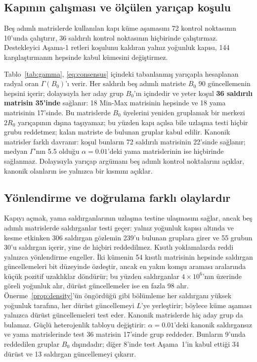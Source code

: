 \documentclass[journal]{IEEEtran}
\begin{document}
\subsection{Kapının çalışması ve ölçülen yarıçap koşulu}
Beş adımlı matrislerde kullanılan kapı küme aşamasını 72 kontrol noktasının 10'unda çalıştırır, 36 saldırılı kontrol noktasının hiçbirinde çalıştırmaz. Destekleyici Aşama-1 retleri koşulunu kaldıran yalnız yoğunluk kapısı, 144 karşılaştırmanın hepsinde kabul kümesini değiştirmez.


Tablo~\ref{tab:gamma}, \eqref{eq:consensus} içindeki tabanlanmış yarıçapla hesaplanan radyal oran $\Gamma(B_0)$'ı verir. Her saldırılı beş adımlı matriste $B_0$ 90 güncellemenin hepsini içerir; dolayısıyla her aday grup $B_0$'ın içindedir ve yeter koşul \textbf{36 saldırılı matrisin 35'inde} sağlanır: 18 Min-Max matrisinin hepsinde ve 18 yama matrisinin 17'sinde. Bu matrislerde $B_0$ üyelerini yeniden gruplamak bir merkezi $2R_0$ yarıçapının dışına taşıyamaz; bu yüzden kapı açılsa bile uzlaşma testi hiçbir grubu reddetmez; kalan matriste de bulunan gruplar kabul edilir. Kanonik matrisler farklı davranır: koşul bunların 72 saldırılı matrisinin 22'sinde sağlanır; medyan $\Gamma$'nın 5.5 olduğu $\alpha=0.01$'deki yama matrislerinin ise hiçbirinde sağlanmaz. Dolayısıyla yarıçap argümanı beş adımlı kontrol noktalarını açıklar, kanonik olanların ise yalnızca bir kısmını açıklar.

\subsection{Yönlendirme ve doğrulama farklı olaylardır}
Kapıyı açmak, yama saldırganlarının uzlaşma testine ulaşmasını sağlar, ancak beş adımlı matrislerde saldırganlar testi geçer: yalnız yoğunluk kapısı altında ve kesme etkinken 306 saldırgan gözlemin 239'u bulunan gruplara girer ve 55 grubun 30'u saldırgan içerir, yine de hiçbiri reddedilmez. Kısıtlı yoklamalarda reddi yalnızca yönlendirme engeller. İki kümenin 54 kısıtlı matrisinin hepsinde saldırgan güncellemeleri bit düzeyinde özdeştir, ancak en yakın komşu araması aralarında küçük pozitif uzaklıklar döndürür; bu yüzden saldırganlar $4\times10^{6}$'nın üzerinde göreli yoğunluk alır, dürüst güncellemeler ise en fazla 98 alır. Önerme~\ref{prop:density}'ün öngördüğü gibi bölümleme her saldırganı yüksek yoğunluk tarafına, her dürüst güncellemeyi $L$'ye yerleştirir; böylece küme aşaması yalnızca dürüst güncellemeleri test eder. Kanonik matrislerde hiç aday grup da bulamaz. Güçlü heterojenlik tabloyu değiştirir: $\alpha=0.01$'deki kanonik saldırgansız ve yama matrislerinde test 36 matrisin 17'sinde grup reddeder. Bunların 9'unda reddedilen gruplar $B_0$ dışındadır; diğer 8'inde test Aşama~1'in kabul ettiği 34 dürüst ve 13 saldırgan güncellemeyi çıkarır.
\end{document}

